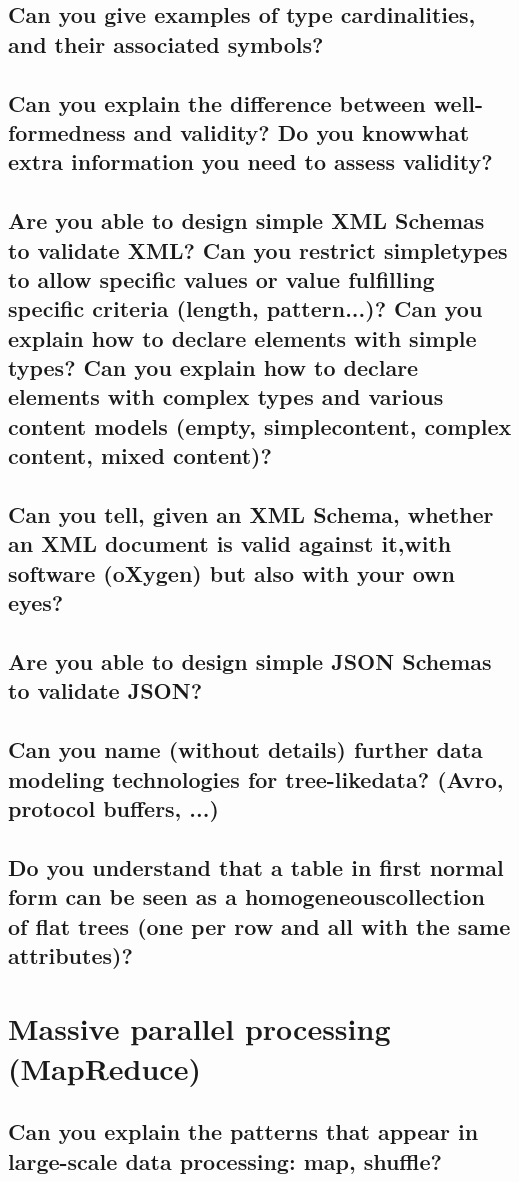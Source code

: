 \documentclass{article}
\begin{document}
\subsection{Can you give examples of type cardinalities, and their associated symbols?}
\subsection{Can you explain the difference between well-formedness and validity? Do you knowwhat extra information you need to assess validity?}
\subsection{Are you able to design simple XML Schemas to validate XML? Can you restrict simpletypes to allow specific values or value fulfilling specific criteria (length, pattern...)? Can you explain how to declare elements with simple types? Can you explain how to declare elements with complex types and various content models (empty, simplecontent, complex content, mixed content)?}
\subsection{Can you tell, given an XML Schema, whether an XML document is valid against it,with software (oXygen) but also with your own eyes?}
\subsection{Are you able to design simple JSON Schemas to validate JSON?}
\subsection{Can you name (without details) further data modeling technologies for tree-likedata? (Avro, protocol buffers, ...)}
\subsection{Do you understand that a table in first normal form can be seen as a homogeneouscollection of flat trees (one per row and all with the same attributes)?}

\pagebreak

\section{Massive parallel processing (MapReduce)}
\subsection{Can you explain the patterns that appear in large-scale data processing: map, shuffle?}
\end{document}
